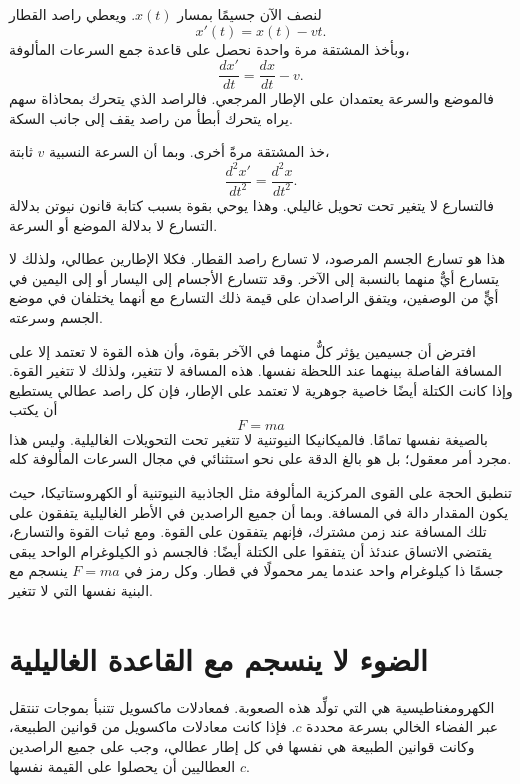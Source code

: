 لنصف الآن جسيمًا بمسار \(x(t)\). ويعطي راصد القطار
\begin{equation}
x'(t)=x(t)-vt.
\end{equation}
وبأخذ المشتقة مرة واحدة نحصل على قاعدة جمع السرعات المألوفة،
\begin{equation}
\frac{dx'}{dt}=\frac{dx}{dt}-v.
\end{equation}
فالموضع والسرعة يعتمدان على الإطار المرجعي. فالراصد الذي يتحرك بمحاذاة سهم يراه يتحرك أبطأ من راصد يقف إلى جانب السكة.

خذ المشتقة مرةً أخرى. وبما أن السرعة النسبية \(v\) ثابتة،
\begin{equation}
\frac{d^2x'}{dt^2}=\frac{d^2x}{dt^2}.
\end{equation}
فالتسارع لا يتغير تحت تحويل غاليلي. وهذا يوحي بقوة بسبب كتابة قانون نيوتن بدلالة التسارع لا بدلالة الموضع أو السرعة.

هذا هو تسارع الجسم المرصود، لا تسارع راصد القطار. فكلا الإطارين عطالي، ولذلك لا يتسارع أيٌّ منهما بالنسبة إلى الآخر. وقد تتسارع الأجسام إلى اليسار أو إلى اليمين في أيٍّ من الوصفين، ويتفق الراصدان على قيمة ذلك التسارع مع أنهما يختلفان في موضع الجسم وسرعته.

افترض أن جسيمين يؤثر كلٌّ منهما في الآخر بقوة، وأن هذه القوة لا تعتمد إلا على المسافة الفاصلة بينهما عند اللحظة نفسها. هذه المسافة لا تتغير، ولذلك لا تتغير القوة. وإذا كانت الكتلة أيضًا خاصية جوهرية لا تعتمد على الإطار، فإن كل راصد عطالي يستطيع أن يكتب
\begin{equation}
F=ma
\end{equation}
بالصيغة نفسها تمامًا. فالميكانيكا النيوتنية لا تتغير تحت التحويلات الغاليلية. وليس هذا مجرد أمر معقول؛ بل هو بالغ الدقة على نحو استثنائي في مجال السرعات المألوفة كله.

تنطبق الحجة على القوى المركزية المألوفة مثل الجاذبية النيوتنية أو الكهروستاتيكا، حيث يكون المقدار دالة في المسافة. وبما أن جميع الراصدين في الأطر الغاليلية يتفقون على تلك المسافة عند زمن مشترك، فإنهم يتفقون على القوة. ومع ثبات القوة والتسارع، يقتضي الاتساق عندئذ أن يتفقوا على الكتلة أيضًا: فالجسم ذو الكيلوغرام الواحد يبقى جسمًا ذا كيلوغرام واحد عندما يمر محمولًا في قطار. وكل رمز في \(F=ma\) ينسجم مع البنية نفسها التي لا تتغير.

\section{الضوء لا ينسجم مع القاعدة الغاليلية}

الكهرومغناطيسية هي التي تولِّد هذه الصعوبة. فمعادلات ماكسويل تتنبأ بموجات تنتقل عبر الفضاء الخالي بسرعة محددة \(c\). فإذا كانت معادلات ماكسويل من قوانين الطبيعة، وكانت قوانين الطبيعة هي نفسها في كل إطار عطالي، وجب على جميع الراصدين العطاليين أن يحصلوا على القيمة نفسها \(c\).

